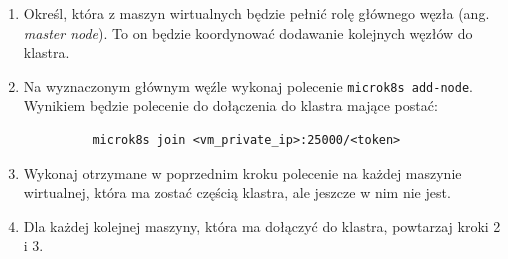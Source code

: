 \begin{enumerate}
    \item Określ, która z maszyn wirtualnych będzie pełnić rolę głównego węzła (ang. \emph{master node}). To on będzie koordynować dodawanie kolejnych węzłów do klastra.
    \item Na wyznaczonym głównym węźle wykonaj polecenie \texttt{microk8s add-node}.
          Wynikiem będzie polecenie do dołączenia do klastra mające postać:
    \begin{figure}[H]
        \begin{verbatim}
    microk8s join <vm_private_ip>:25000/<token>
        \end{verbatim}
        \label{fig:join-cluster-command}
    \end{figure}
    \item Wykonaj otrzymane w poprzednim kroku polecenie na każdej maszynie wirtualnej, która ma zostać częścią klastra, ale jeszcze w nim nie jest.
    \item Dla każdej kolejnej maszyny, która ma dołączyć do klastra, powtarzaj kroki 2 i 3.
\end{enumerate}